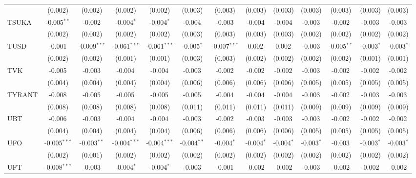 \begin{table}[!htbp]
\begin{tabular}{@{\extracolsep{5pt}}lcccccccccccc}
  & (0.002) & (0.002) & (0.002) & (0.002) & (0.003) & (0.003) & (0.003) & (0.003) & (0.003) & (0.003) & (0.003) & (0.003) \\
 TSUKA & -0.005$^{**}$ & -0.002$^{}$ & -0.004$^{*}$ & -0.004$^{*}$ & -0.004$^{}$ & -0.003$^{}$ & -0.004$^{}$ & -0.004$^{}$ & -0.003$^{}$ & -0.002$^{}$ & -0.003$^{}$ & -0.003$^{}$ \\
  & (0.002) & (0.002) & (0.002) & (0.002) & (0.003) & (0.003) & (0.003) & (0.003) & (0.002) & (0.002) & (0.002) & (0.002) \\
 TUSD & -0.001$^{}$ & -0.009$^{***}$ & -0.061$^{***}$ & -0.061$^{***}$ & -0.005$^{*}$ & -0.007$^{***}$ & 0.002$^{}$ & 0.002$^{}$ & -0.003$^{}$ & -0.005$^{**}$ & -0.003$^{*}$ & -0.003$^{*}$ \\
  & (0.002) & (0.002) & (0.001) & (0.001) & (0.003) & (0.003) & (0.002) & (0.002) & (0.002) & (0.002) & (0.001) & (0.001) \\
 TVK & -0.005$^{}$ & -0.003$^{}$ & -0.004$^{}$ & -0.004$^{}$ & -0.003$^{}$ & -0.002$^{}$ & -0.002$^{}$ & -0.002$^{}$ & -0.003$^{}$ & -0.002$^{}$ & -0.002$^{}$ & -0.002$^{}$ \\
  & (0.004) & (0.004) & (0.004) & (0.004) & (0.006) & (0.006) & (0.006) & (0.006) & (0.005) & (0.005) & (0.005) & (0.005) \\
 TYRANT & -0.008$^{}$ & -0.005$^{}$ & -0.005$^{}$ & -0.005$^{}$ & -0.005$^{}$ & -0.004$^{}$ & -0.004$^{}$ & -0.004$^{}$ & -0.003$^{}$ & -0.002$^{}$ & -0.003$^{}$ & -0.003$^{}$ \\
  & (0.008) & (0.008) & (0.008) & (0.008) & (0.011) & (0.011) & (0.011) & (0.011) & (0.009) & (0.009) & (0.009) & (0.009) \\
 UBT & -0.006$^{}$ & -0.003$^{}$ & -0.004$^{}$ & -0.004$^{}$ & -0.003$^{}$ & -0.002$^{}$ & -0.003$^{}$ & -0.003$^{}$ & -0.003$^{}$ & -0.002$^{}$ & -0.002$^{}$ & -0.002$^{}$ \\
  & (0.004) & (0.004) & (0.004) & (0.004) & (0.006) & (0.006) & (0.006) & (0.006) & (0.005) & (0.005) & (0.005) & (0.005) \\
 UFO & -0.005$^{***}$ & -0.003$^{**}$ & -0.004$^{***}$ & -0.004$^{***}$ & -0.004$^{**}$ & -0.004$^{*}$ & -0.004$^{*}$ & -0.004$^{*}$ & -0.003$^{*}$ & -0.003$^{}$ & -0.003$^{*}$ & -0.003$^{*}$ \\
  & (0.002) & (0.001) & (0.002) & (0.002) & (0.002) & (0.002) & (0.002) & (0.002) & (0.002) & (0.002) & (0.002) & (0.002) \\
 UFT & -0.008$^{***}$ & -0.003$^{}$ & -0.004$^{*}$ & -0.004$^{*}$ & -0.003$^{}$ & -0.001$^{}$ & -0.002$^{}$ & -0.002$^{}$ & -0.003$^{}$ & -0.002$^{}$ & -0.002$^{}$ & -0.002$^{}$ \\

\end{tabular}
\end{table}
